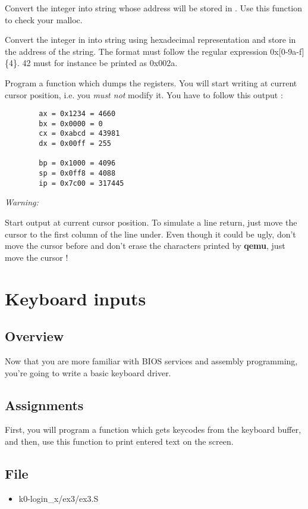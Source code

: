 {
  Convert the integer  into string whose address will be
  stored in . Use this function to check your malloc.
}

{
  Convert the integer in  into string using hexadecimal
  representation and store in  the address of the string.
  The format must follow the regular expression 0x[0-9a-f]\{4\}.
  42 must for instance be printed as 0x002a.
}

{
  Program a function which dumps the registers. You will start writing
  at current cursor position, i.e. you \emph{must not} modify it. You have to
  follow this output :
}
\begin{verbatim}
        ax = 0x1234 = 4660
        bx = 0x0000 = 0
        cx = 0xabcd = 43981
        dx = 0x00ff = 255

        bp = 0x1000 = 4096
        sp = 0x0ff8 = 4088
        ip = 0x7c00 = 317445
\end{verbatim}

\function{}{}
{
  {\em Warning:}

  Start output at current cursor position. To simulate a line return, just move
  the cursor to the first column of the line under. Even though it could be
  ugly, don't move the cursor before and don't erase the characters printed by
  \textbf{qemu}, just move the cursor !
}

%
%

\newpage

\section{Keyboard inputs}

\subsection*{Overview}
Now that you are more familiar with BIOS services and assembly programming,
you're going to write a basic keyboard driver.

\subsection*{Assignments}
First, you will program a function which gets keycodes from the keyboard
buffer, and then, use this function to print entered text on the screen.

\subsection*{File}
\begin{itemize}
  \item k0-login\_x/ex3/ex3.S
\end{itemize}

